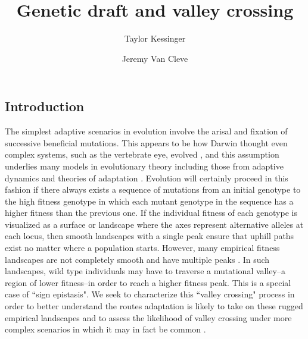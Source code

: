 \documentclass[10pt,twocolumn,twoside]{gsajnl}
\title{Genetic draft and valley crossing}
\author[$\ast$]{Taylor Kessinger}
\author[$\ast$,1]{Jeremy Van Cleve}
\affil[$\ast$]{Department of Biology, University of Kentucky}
\begin{document}
\maketitle
\thispagestyle{firststyle}
\marginmark
\firstpagefootnote



\begin{spacing}{1.5}

\section{Introduction}

The simplest adaptive scenarios in evolution involve the arisal and fixation of successive beneficial mutations.
This appears to be how Darwin thought even complex systems, such as the vertebrate eye, evolved \citep{darwin_1859}, and this assumption underlies many models in evolutionary theory including those from adaptive dynamics \citep{Geritz:Kisdi:1998,Dercole:Rinaldi:2008} and theories of adaptation \citep{Gillespie:1983,Orr:1998,Gillespie:1991}.
Evolution will certainly proceed in this fashion if there always exists a sequence of mutations from an initial genotype to the high fitness genotype in which each mutant genotype in the sequence has a higher fitness than the previous one.
If the individual fitness of each genotype is visualized as a surface or landscape where the axes represent alternative alleles at each locus, then smooth landscapes with a single peak ensure that uphill paths exist no matter where a population starts.
However, many empirical fitness landscapes are not completely smooth and have multiple peaks \citep[reviewed in][]{Szendro:Schenk:2013,Visser:Krug:2014,Obolski:Ram:2018}.
In such landscapes, wild type individuals may have to traverse a mutational valley--a region of lower fitness--in order to reach a higher fitness peak.
This is a special case of ``sign epistasis".
We seek to characterize this ``valley crossing" process in order to better understand the routes adaptation is likely to take on these rugged empirical landscapes \citep[e.g.,][]{Aguilar-Rodriguez:Payne:2017} and to assess the likelihood of valley crossing under more complex scenarios in which it may in fact be common \citep[e.g.][]{trotter_2014}.


\end{spacing}
\end{document}
